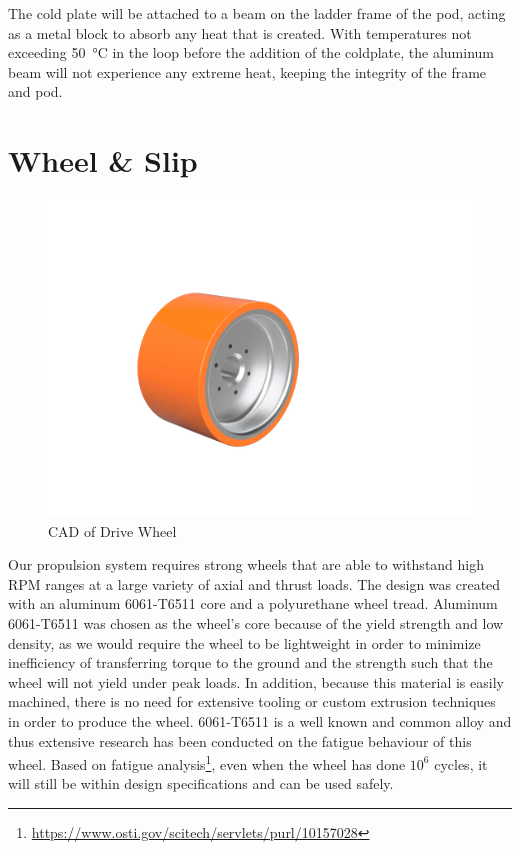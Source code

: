 \documentclass[main.tex]{subfiles}
\begin{document}
    The cold plate will be attached to a beam on the ladder frame of the pod, acting as a metal block to absorb any heat that is created. With temperatures not exceeding \SI{50}{\celsius} in the loop before the addition of the coldplate, the aluminum beam will not experience any extreme heat, keeping the integrity of the frame and pod.

    \section{Wheel \& Slip}

    \begin{figure}[H]
        \centering
        \includegraphics[width=\linewidth]{images/fig19}
        \caption{CAD of Drive Wheel}
    \end{figure}
    Our propulsion system requires strong wheels that are able to withstand high RPM ranges at a large variety of axial and thrust loads. The design was created with an aluminum 6061-T6511 core and a polyurethane wheel tread. Aluminum 6061-T6511 was chosen as the wheel’s core because of the yield strength and low density, as we would require the wheel to be lightweight in order to minimize inefficiency of transferring torque to the ground and the strength such that the wheel will not yield under peak loads. In addition, because this material is easily machined, there is no need for extensive tooling or custom extrusion techniques in order to produce the wheel. 6061-T6511 is a well known and common alloy and thus extensive research has been conducted on the fatigue behaviour of this wheel. Based on fatigue analysis\footnote{\url{https://www.osti.gov/scitech/servlets/purl/10157028}}, even when the wheel has done $10^6$ cycles, it will still be within design specifications and can be used safely.\\
\end{document}
